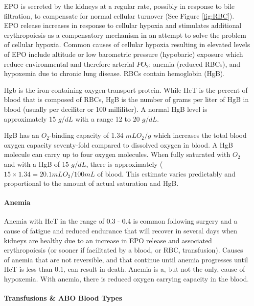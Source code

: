 EPO is secreted by the kidneys at a regular rate, possibly in response to bile filtration, to compensate for normal cellular turnover (See Figure \ref{fig:RBC}). EPO release increases in response to cellular hypoxia and stimulates additional erythropoiesis as a compensatory mechanism in an attempt to solve the problem of cellular hypoxia. Common causes of cellular hypoxia resulting in elevated levels of EPO include altitude or low barometric pressure (hypobaric) exposure which reduce environmental and therefore arterial $PO_2$; anemia (reduced RBCs), and hypoxemia due to chronic lung disease. RBCs contain hemoglobin (HgB). 

Hgb is the iron-containing oxygen-transport protein. While HcT is the percent of blood that is composed of RBCs, HgB is the number of grams per liter of HgB in blood (usually per deciliter or 100 milliliter\footnotemark{}). A normal HgB level is approximately 15 $g/dL$ with a range 12 to 20 $g/dL$.

HgB has an $O_2$-binding capacity of 1.34 $mL O_2 / g$ which increases the total blood oxygen capacity seventy-fold compared to dissolved oxygen in blood. A HgB molecule can carry up to four oxygen molecules. When fully saturated with $O_2$ and with a HgB of 15 $g/dL$, there is approximately ($15 \times 1.34 = 20.1 mL O_2/ 100 mL$ of blood. This estimate varies predictably and proportional to the amount of actual saturation and HgB.

\paragraph{Anemia}
Anemia with HcT in the range of 0.3 - 0.4 is common following surgery and a cause of fatigue and reduced endurance that will recover in several days when kidneys are healthy due to an increase in EPO release and associated erythropoiesis (or sooner if facilitated by a blood, or RBC, transfusion). Causes of anemia that are not reversible, and that continue until anemia progresses until HcT is less than 0.1, can result in death. Anemia is a, but not the only, cause of hypoxemia. With anemia, there is reduced oxygen carrying capacity in the blood.


\paragraph{Transfusions \& ABO Blood Types}

